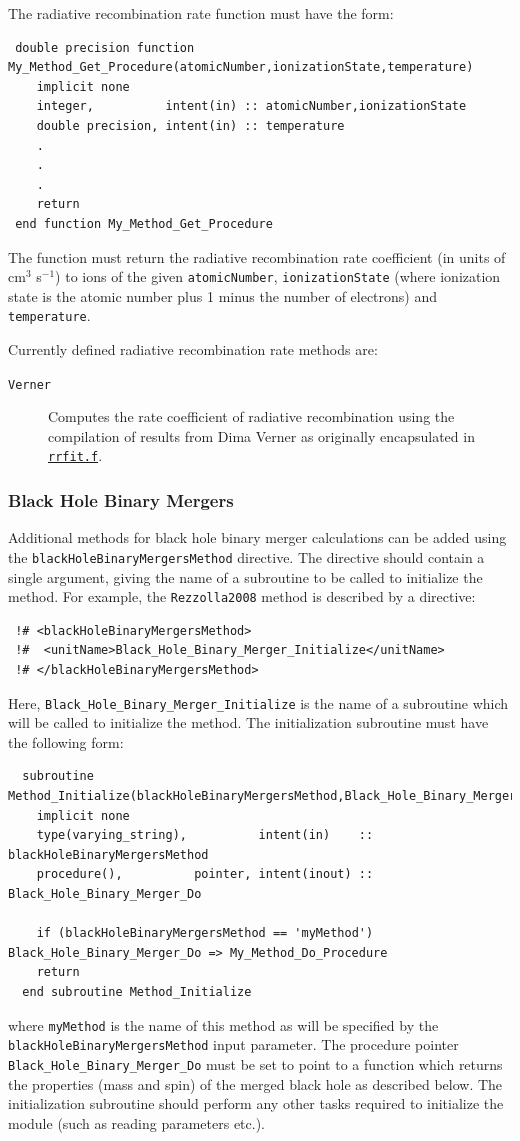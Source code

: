The radiative recombination rate function must have the form:
\begin{verbatim}
 double precision function My_Method_Get_Procedure(atomicNumber,ionizationState,temperature)
    implicit none
    integer,          intent(in) :: atomicNumber,ionizationState
    double precision, intent(in) :: temperature
    .
    .
    .
    return
 end function My_Method_Get_Procedure
\end{verbatim}
The function must return the radiative recombination rate coefficient (in units of cm$^3$ s$^{-1}$) to ions of the given {\tt atomicNumber}, {\tt ionizationState} (where ionization state is the atomic number plus 1 minus the number of electrons) and {\tt temperature}.

Currently defined radiative recombination rate methods are:
\begin{description}
 \item [{\tt Verner}]  Computes the rate coefficient of radiative recombination using the compilation of results from Dima Verner as originally encapsulated in \href{ftp://gradj.pa.uky.edu//dima//rec//rrfit.f}{{\tt rrfit.f}}.
\end{description}

\subsubsection{Black Hole Binary Mergers}\label{sec:BlackHoleBinaryMergers}

Additional methods for black hole binary merger calculations can be added using the {\tt blackHoleBinaryMergersMethod} directive. The directive should contain a single argument, giving the name of a subroutine to be called to initialize the method. For example, the {\tt Rezzolla2008} method is described by a directive:
\begin{verbatim}
 !# <blackHoleBinaryMergersMethod>
 !#  <unitName>Black_Hole_Binary_Merger_Initialize</unitName>
 !# </blackHoleBinaryMergersMethod>
\end{verbatim}
Here, {\tt Black\_Hole\_Binary\_Merger\_Initialize} is the name of a subroutine which will be called to initialize the method. The initialization subroutine must have the following form:
\begin{verbatim}
  subroutine Method_Initialize(blackHoleBinaryMergersMethod,Black_Hole_Binary_Merger_Do)
    implicit none
    type(varying_string),          intent(in)    :: blackHoleBinaryMergersMethod
    procedure(),          pointer, intent(inout) :: Black_Hole_Binary_Merger_Do
    
    if (blackHoleBinaryMergersMethod == 'myMethod') Black_Hole_Binary_Merger_Do => My_Method_Do_Procedure
    return
  end subroutine Method_Initialize
\end{verbatim}
where {\tt myMethod} is the name of this method as will be specified by the {\tt blackHoleBinaryMergersMethod} input parameter. The procedure pointer {\tt Black\_Hole\_Binary\_Merger\_Do} must be set to point to a function which returns the properties (mass and spin) of the merged black hole as described below. The initialization subroutine should perform any other tasks required to initialize the module (such as reading parameters etc.).

